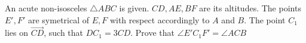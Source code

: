 An acute non-isosceles $\triangle ABC$ is given. $CD, AE, BF$ are its altitudes. The points $E', F'$ are symetrical of $E, F$ with respect accordingly to $A$ and $B$. The point $C_1$ lies on $\overrightarrow{CD}$, such that $DC_1=3CD$.
Prove that $\angle E'C_1F'=\angle ACB$